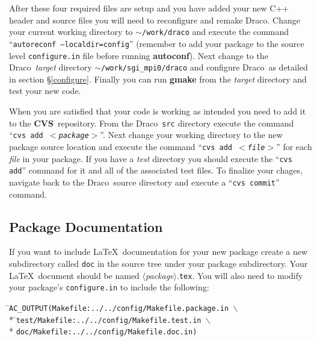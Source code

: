\documentclass[10pt]{nmemo}
\newcommand{\comp}[1]{\normalfont\normalsize\texttt{#1}}
\newcommand{\draco}{{\normalfont\sffamily Draco}}
\newcommand{\cvs}{{\normalfont\bfseries CVS}}
\begin{document}
After these four required files are setup and you have added your new
C++ header and source files you will need to reconfigure and remake
\draco.  Change your current working directory to
\comp{$\sim$/work/draco} and execute the command ``\comp{autoreconf
  --localdir=config}'' (remember to add your package to the source
level \comp{configure.in} file before running \textbf{autoconf}).
Next change to the \draco\ \emph{target} directory
\comp{$\sim$/work/sgi\_mpi0/draco} and configure \draco\ as detailed
in section \S\ref{configure}.  Finally you can run \textbf{gmake} from
the \emph{target} directory and test your new code.

When you are satisfied that your code is working as intended you need
to add it to the \cvs\ repository.  From the \draco\ \comp{src}
directory execute the command ``\comp{cvs add $<$\emph{package}$>$}''.
Next change your working directory to the new package source location
and execute the command ``\comp{cvs add $<$\emph{file}$>$}'' for each
\emph{file} in your package.  If you have a \emph{test} directory you
should execute the ``\comp{cvs add}'' command for it and all of the
associated test files.  To finalize your chages, navigate back to the
\draco\ source directory and execute a ``\comp{cvs commit}'' command.

\subsection{Package Documentation}

If you want to include \LaTeX\ documentation for your new package
create a new subdirectory called \comp{doc} in the source tree under
your package subdirectory.  Your \LaTeX\ document should be named
$\langle$\emph{package}$\rangle$.\comp{tex}.  You will also need to
modify your package's \comp{configure.in} to include the following:

\footnotesize
\begin{tabbing}
\hspace{0.5in}\=\comp{AC\_OUTPUT(Makefile:../../config/Makefile.package.in $\backslash$} \\*
\>\hspace{0.5in}\=\comp{test/Makefile:../../config/Makefile.test.in $\backslash$} \\*
\>\>\comp{doc/Makefile:../../config/Makefile.doc.in)}
\end{tabbing}
\normalsize

\end{document}
